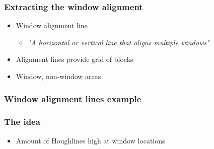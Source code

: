 \documentclass{beamer}
\begin{document}
\frame
{
	\frametitle{Extracting the window alignment}
	\begin{itemize}
	\item Window alignment line
	\begin{itemize}
		\item <+-| alert@+> \emph{"A horizontal or vertical line that aligns multiple windows"}
	\end{itemize}
	\item <+-| alert@+> Alignment lines provide grid of blocks
	\item <+-| alert@+> Window, non-window areas
	\end{itemize}
	
}


\frame
{
	\frametitle{Window alignment lines example}
}

\frame
{
	\frametitle{The idea}
	\begin{itemize}
	\item <+-| alert@+> Amount of Houghlines high at window locations
	\end{itemize}
}
\end{document}
